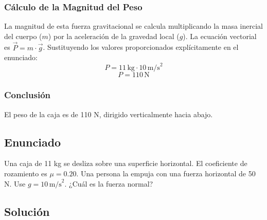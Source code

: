 \documentclass[12pt]{article}
\begin{document}
\subsubsection*{Cálculo de la Magnitud del Peso}
La magnitud de esta fuerza gravitacional se calcula multiplicando la masa inercial del cuerpo ($m$) por la aceleración de la gravedad local ($g$). La ecuación vectorial es $\vec{P} = m \cdot \vec{g}$.
Sustituyendo los valores proporcionados explícitamente en el enunciado:
\begin{equation}
    P = 11 \, \text{kg} \cdot 10 \, \text{m/s}^2
\end{equation}
\begin{equation}
    P = 110 \, \text{N}
\end{equation}

\subsubsection*{Conclusión}
El peso de la caja es de 110 N, dirigido verticalmente hacia abajo.

\newpage

\subsection*{Enunciado}
Una caja de 11 kg se desliza sobre una superficie horizontal. El coeficiente de rozamiento es $\mu = 0.20$. Una persona la empuja con una fuerza horizontal de 50 N. Use $g = 10 \, \text{m/s}^2$. ¿Cuál es la fuerza normal?

\begin{center}
\end{center}

\subsection*{Solución}
\end{document}
